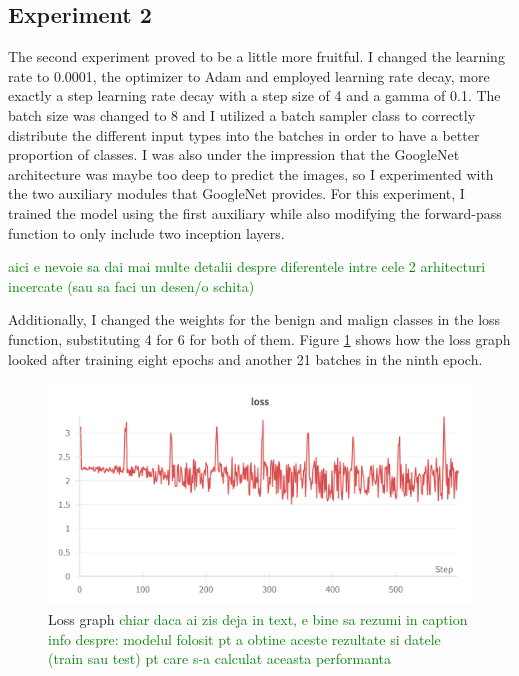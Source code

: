 \subsection{Experiment 2}

The second experiment proved to be a little more fruitful. I changed the learning rate to 0.0001, the optimizer to Adam and employed learning rate decay, more exactly a step learning rate decay with a step size of 4 and a gamma of 0.1. The batch size was changed to 8 and I utilized a batch sampler class to correctly distribute the different input types into the batches in order to have a better proportion of classes. I was also under the impression that the GoogleNet architecture was maybe too deep to predict the images, so I experimented with the two auxiliary modules that GoogleNet provides. For this experiment, I trained the model using the first auxiliary while also modifying the forward-pass function to only include two inception layers.

\textcolor{green}{aici e nevoie sa dai mai multe detalii despre diferentele intre cele 2 arhitecturi incercate (sau sa faci un desen/o schita)}

Additionally, I changed the weights for the benign and malign classes in the loss function, substituting 4 for 6 for both of them. Figure \ref{fig:fig10} shows how the loss graph looked after training eight epochs and another 21 batches in the ninth epoch.

\begin{figure}[!ht]
    \centering
    \includegraphics[width=1\textwidth]{figures/Figure11.png}
    \caption{Loss graph
    \textcolor{green}{chiar daca ai zis deja in text, e bine sa rezumi in caption info despre: modelul folosit pt a obtine aceste rezultate si datele (train sau test) pt care s-a calculat aceasta performanta} 
    }
    \label{fig:fig10}
\end{figure}

